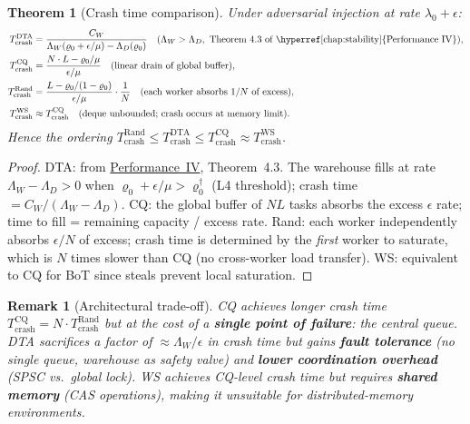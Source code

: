 \documentclass[11pt,a4paper]{report}
\newtheorem{theorem}{Theorem}[section]
\newtheorem{remark}{Remark}[section]
\begin{document}
\begin{theorem}[Crash time comparison]\label{thm:crash_compare}
Under adversarial injection at rate $\lambda_0 + \epsilon$:
\begin{align}
  T_{\mathrm{crash}}^{\mathrm{DTA}} &= \frac{C_W}{\Lambda_W(\varrho_0+\epsilon/\mu) - \Lambda_D(\varrho_0)}
     \quad (\Lambda_W > \Lambda_D, \text{ Theorem~4.3 of \hyperref[chap:stability]{Performance~IV}}),
     \label{eq:T_dta}\\
  T_{\mathrm{crash}}^{\mathrm{CQ}} &= \frac{N \cdot L - \varrho_0/\mu}{\epsilon/\mu}
     \quad (\text{linear drain of global buffer}), \label{eq:T_cq}\\
  T_{\mathrm{crash}}^{\mathrm{Rand}} &= \frac{L - \varrho_0/(1-\varrho_0)}{\epsilon/\mu}
     \cdot \frac{1}{N} \quad (\text{each worker absorbs } 1/N \text{ of excess}),
     \label{eq:T_rand}\\
  T_{\mathrm{crash}}^{\mathrm{WS}} &\approx T_{\mathrm{crash}}^{\mathrm{CQ}}
     \quad (\text{deque unbounded; crash occurs at memory limit}).
     \label{eq:T_ws}
\end{align}
Hence the ordering $T_{\mathrm{crash}}^{\mathrm{Rand}} \le T_{\mathrm{crash}}^{\mathrm{DTA}}
\le T_{\mathrm{crash}}^{\mathrm{CQ}} \approx T_{\mathrm{crash}}^{\mathrm{WS}}$.
\end{theorem}

\begin{proof}
DTA: from \hyperref[chap:stability]{Performance~IV}, Theorem~4.3.  The warehouse fills at rate
$\Lambda_W - \Lambda_D > 0$ when $\varrho_0 + \epsilon/\mu > \varrho_0^\dagger$
(L4 threshold); crash time $= C_W / (\Lambda_W - \Lambda_D)$.
CQ: the global buffer of $NL$ tasks absorbs the excess $\epsilon$ rate;
time to fill = remaining capacity / excess rate.
Rand: each worker independently absorbs $\epsilon/N$ of excess;
crash time is determined by the \emph{first} worker to saturate, which is
$N$ times slower than CQ (no cross-worker load transfer).
WS: equivalent to CQ for BoT since steals prevent local saturation.
\end{proof}

\begin{remark}[Architectural trade-off]
CQ achieves longer crash time $T_{\mathrm{crash}}^{\mathrm{CQ}} = N \cdot T_{\mathrm{crash}}^{\mathrm{Rand}}$
but at the cost of a \textbf{single point of failure}: the central queue.
DTA sacrifices a factor of $\approx \Lambda_W/\epsilon$ in crash time
but gains \textbf{fault tolerance} (no single queue, warehouse as safety valve)
and \textbf{lower coordination overhead} (SPSC vs.\ global lock).
WS achieves CQ-level crash time but requires \textbf{shared memory}
(CAS operations), making it unsuitable for distributed-memory environments.
\end{remark}
\end{document}
